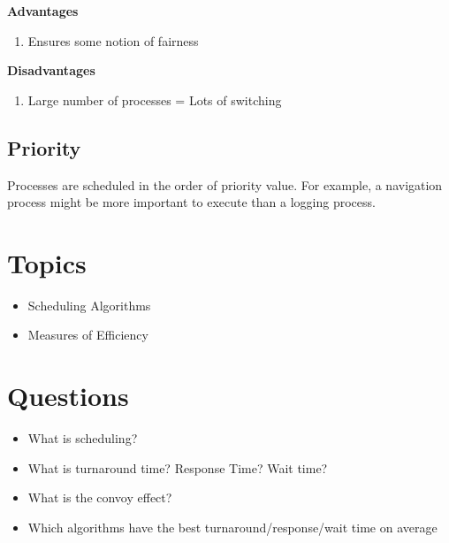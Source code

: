 \textbf{Advantages} 

\begin{enumerate}
  \item Ensures some notion of fairness
\end{enumerate}

\textbf{Disadvantages} 

\begin{enumerate}
  \item Large number of processes = Lots of switching
\end{enumerate}

\subsection{Priority}

Processes are scheduled in the order of priority value. For example, a navigation process might be more important to execute than a logging process.

\section{Topics}

\begin{itemize}
\tightlist
\item
  Scheduling Algorithms
\item
  Measures of Efficiency
\end{itemize}

\section{Questions}

\begin{itemize}
\tightlist
\item
  What is scheduling?
\item
  What is turnaround time? Response Time? Wait time?
\item
  What is the convoy effect?
\item
  Which algorithms have the best turnaround/response/wait time on average
\end{itemize}


